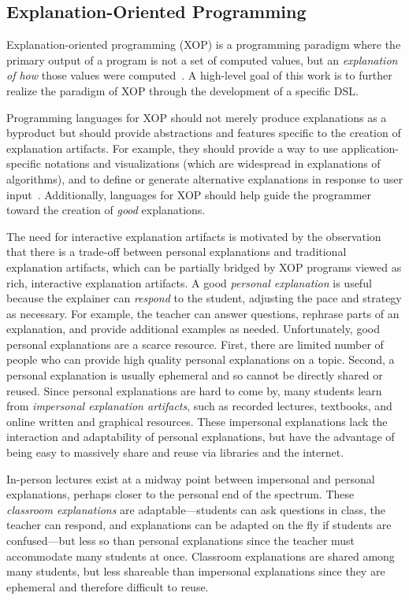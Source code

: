 \documentclass[sigconf]{acmart}
\begin{document}
\subsection{Explanation-Oriented Programming}
\label{sec:back:xop}

Explanation-oriented programming (XOP) is a programming paradigm where the
primary output of a program is not a set of computed values, but an
\emph{explanation of how} those values were
computed~\cite{EW08vl,EW09dsl,EW09vl,WE11dsl,EW13jvlc}.
%
A high-level goal of this work is to further realize the paradigm of XOP
through the development of a specific DSL.


Programming languages for XOP should not merely produce explanations as a
byproduct but should provide abstractions and features specific to the creation
of explanation artifacts. For example, they should provide a way to use
application-specific notations and visualizations (which are widespread in
explanations of algorithms), and to define or generate alternative explanations
in response to user input~\cite{EW13jvlc}. Additionally, languages for XOP
should help guide the programmer toward the creation of \emph{good}
explanations.


The need for interactive explanation artifacts is motivated by the observation
that there is a trade-off between personal explanations and traditional
explanation artifacts, which can be partially bridged by XOP programs viewed as
rich, interactive explanation artifacts.
%
A good \emph{personal explanation} is useful because the explainer can
\emph{respond} to the student, adjusting the pace and strategy as necessary.
For example, the teacher can answer questions, rephrase parts of an
explanation, and provide additional examples as needed.
%
Unfortunately, good personal explanations are a scarce resource. First, there
are limited number of people who can provide high quality personal explanations
on a topic. Second, a personal explanation is usually ephemeral and so cannot
be directly shared or reused.
%
Since personal explanations are hard to come by, many students learn from
\emph{impersonal explanation artifacts}, such as recorded lectures, textbooks,
and online written and graphical resources.
%
These impersonal explanations lack the interaction and adaptability of personal
explanations, but have the advantage of being easy to massively share and reuse
via libraries and the internet.


In-person lectures exist at a midway point between impersonal and personal
explanations, perhaps closer to the personal end of the spectrum. These
\emph{classroom explanations} are adaptable---students can ask questions in
class, the teacher can respond, and explanations can be adapted on the fly if
students are confused---but less so than personal explanations since the
teacher must accommodate many students at once. Classroom explanations are
shared among many students, but less shareable than impersonal explanations
since they are ephemeral and therefore difficult to reuse.
\end{document}
